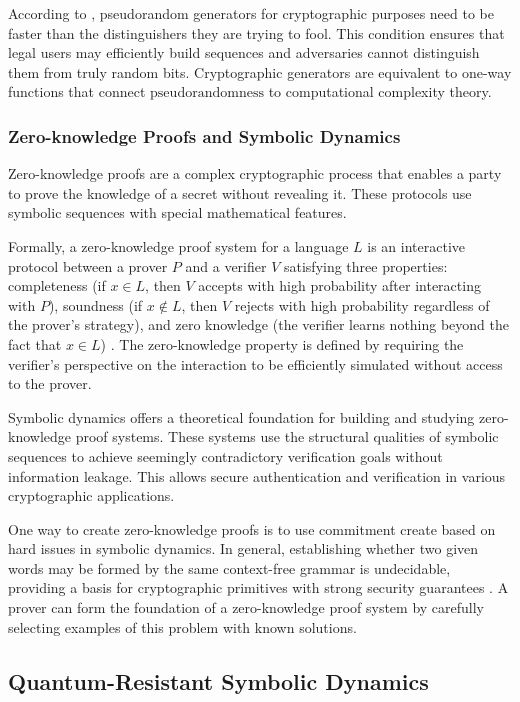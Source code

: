 \documentclass[12pt,a4paper]{article}
\begin{document}
According to \cite{Vadhan}, pseudorandom generators for cryptographic purposes need to be faster than the distinguishers they are trying to fool. This condition ensures that legal users may efficiently build sequences and adversaries cannot distinguish them from truly random bits. Cryptographic generators are equivalent to one-way functions that connect $\mathrm{pseudorandomness}$ to computational complexity theory.
\subsubsection{Zero-knowledge Proofs and Symbolic Dynamics}

Zero-knowledge proofs are a complex cryptographic process that enables a party to prove the knowledge of a secret without revealing it. These protocols use symbolic sequences with special mathematical features.

Formally, a zero-knowledge proof system for a language $L$ is an interactive protocol between a prover $P$ and a verifier $V$ satisfying three properties: completeness (if $x \in L$, then $V$ accepts with high probability after interacting with $P$), soundness (if $x \notin L$, then $V$ rejects with high probability regardless of the prover's strategy), and zero knowledge (the verifier learns nothing beyond the fact that $x \in L$) \cite{Goldwasser}. The zero-knowledge property is defined by requiring the verifier's perspective on the interaction to be efficiently simulated without access to the prover.

Symbolic dynamics offers a theoretical foundation for building and studying zero-knowledge proof systems. These systems use the structural qualities of symbolic sequences to achieve seemingly contradictory verification goals without information leakage. This allows secure authentication and verification in various cryptographic applications.

One way to create zero-knowledge proofs is to use commitment create based on hard issues in symbolic dynamics. In general, establishing whether two given words may be formed by the same context-free grammar is undecidable, providing a basis for cryptographic primitives with strong security guarantees \cite{Hopcroft}. A prover can form the foundation of a zero-knowledge proof system by carefully selecting examples of this problem with known solutions.
\subsection{Quantum-Resistant Symbolic Dynamics}
\end{document}
